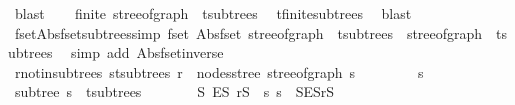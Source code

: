 \begin{isabellebody}
\ blast\isanewline
\isanewline
\ \ \isamarkupfalse%
\ {\isachardoublequoteopen}finite\ {\isacharparenleft}{\kern0pt}stree{\isacharunderscore}{\kern0pt}of{\isacharunderscore}{\kern0pt}graph\ {\isacharbackquote}{\kern0pt}\ t{\isachardot}{\kern0pt}subtrees{\isacharparenright}{\kern0pt}{\isachardoublequoteclose}\ \isamarkupfalse%
\ t{\isachardot}{\kern0pt}finite{\isacharunderscore}{\kern0pt}subtrees\ \isamarkupfalse%
\ blast\isanewline
\ \ \isamarkupfalse%
\ \isamarkupfalse%
\ fset{\isacharunderscore}{\kern0pt}Abs{\isacharunderscore}{\kern0pt}fset{\isacharunderscore}{\kern0pt}subtrees{\isacharbrackleft}{\kern0pt}simp{\isacharbrackright}{\kern0pt}{\isacharcolon}{\kern0pt}\ {\isachardoublequoteopen}fset\ {\isacharparenleft}{\kern0pt}Abs{\isacharunderscore}{\kern0pt}fset\ {\isacharparenleft}{\kern0pt}stree{\isacharunderscore}{\kern0pt}of{\isacharunderscore}{\kern0pt}graph\ {\isacharbackquote}{\kern0pt}\ t{\isachardot}{\kern0pt}subtrees{\isacharparenright}{\kern0pt}{\isacharparenright}{\kern0pt}\ {\isacharequal}{\kern0pt}\ stree{\isacharunderscore}{\kern0pt}of{\isacharunderscore}{\kern0pt}graph\ {\isacharbackquote}{\kern0pt}\ t{\isachardot}{\kern0pt}subtrees{\isachardoublequoteclose}\ \isamarkupfalse%
\ {\isacharparenleft}{\kern0pt}simp\ add{\isacharcolon}{\kern0pt}\ Abs{\isacharunderscore}{\kern0pt}fset{\isacharunderscore}{\kern0pt}inverse{\isacharparenright}{\kern0pt}\isanewline
\isanewline
\ \ \isamarkupfalse%
\ r{\isacharunderscore}{\kern0pt}notin{\isacharunderscore}{\kern0pt}subtrees{\isacharcolon}{\kern0pt}\ {\isachardoublequoteopen}{\isasymforall}s{\isasymin}t{\isachardot}{\kern0pt}subtrees{\isachardot}{\kern0pt}\ r\ {\isasymnotin}\ nodes{\isacharunderscore}{\kern0pt}stree\ {\isacharparenleft}{\kern0pt}stree{\isacharunderscore}{\kern0pt}of{\isacharunderscore}{\kern0pt}graph\ s{\isacharparenright}{\kern0pt}{\isachardoublequoteclose}\isanewline
\ \ \isamarkupfalse%
\isanewline
\ \ \ \ \isamarkupfalse%
\ s\ \isamarkupfalse%
\ subtree{\isacharcolon}{\kern0pt}\ {\isachardoublequoteopen}s\ {\isasymin}\ t{\isachardot}{\kern0pt}subtrees{\isachardoublequoteclose}\isanewline
\ \ \ \ \isamarkupfalse%
\ \isamarkupfalse%
\ S\ E\isactrlsub S\ r\isactrlsub S\ \ s{\isacharcolon}{\kern0pt}\ {\isachardoublequoteopen}s\ {\isacharequal}{\kern0pt}\ {\isacharparenleft}{\kern0pt}S{\isacharcomma}{\kern0pt}E\isactrlsub S{\isacharcomma}{\kern0pt}r\isactrlsub S{\isacharparenright}{\kern0pt}{\isachardoublequoteclose}\ \isamarkupfalse%

\end{isabellebody}
